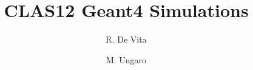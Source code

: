 \title{CLAS12 Geant4 Simulations}

\author[B]{R. De Vita}
\author[A]{M. Ungaro}

\address[A]{Thomas Jefferson National Accelerator Facility, Newport News, VA, USA}
\address[B]{Istituto Nazionale Di Fisica Nucleare, Genova, Italy}
